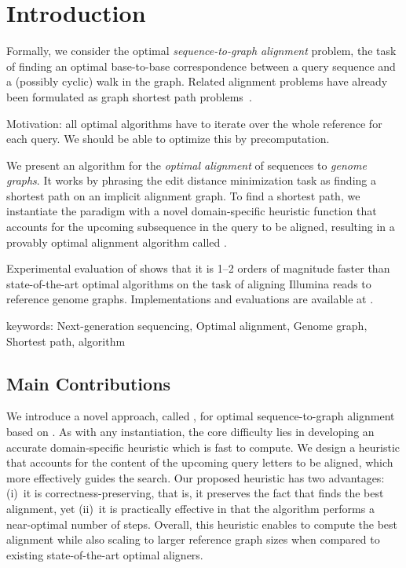 \section{Introduction}

Formally, we consider the optimal \emph{sequence-to-graph alignment} problem,
the task of finding an optimal base-to-base correspondence between a query
sequence and a (possibly cyclic) walk in the graph. Related alignment problems
have already been formulated as graph shortest path
problems~\cite{jain_complexity_2019}.

Motivation: all optimal algorithms have to iterate over the whole reference for
each query. We should be able to optimize this by precomputation.

We present an algorithm for the \emph{optimal alignment} of sequences to
\emph{genome graphs}. It works by phrasing the edit distance minimization
task as finding a shortest path on an implicit alignment graph. To find a
shortest path, we instantiate the \A paradigm with a novel domain-specific
heuristic function that accounts for the upcoming subsequence in the query
to be aligned, resulting in a provably optimal alignment algorithm called
\astarix.

\quad \quad Experimental evaluation of \astarix shows that it is 1--2
orders of magnitude faster than state-of-the-art optimal algorithms on the
task of aligning Illumina reads to reference genome graphs. Implementations
and evaluations are available at \mbox{\astarixurl}.

keywords: Next-generation sequencing, Optimal alignment, Genome graph,
Shortest path, \A algorithm

\subsection{Main Contributions}
We introduce a novel approach, called \astarix, for optimal sequence-to-graph
alignment based on \A. As with any \A instantiation, the core difficulty lies in
developing an accurate domain-specific heuristic which is fast to compute. We
design a heuristic that accounts for the content of the upcoming query letters
to be aligned, which more effectively guides the search. Our proposed heuristic
has two advantages: (i)~it is correctness-preserving, that is, it preserves the
fact that \astarix finds the best alignment, yet (ii)~it is practically
effective in that the algorithm performs a near-optimal number of steps.
Overall, this heuristic enables \astarix to compute the best alignment while
also scaling to larger reference graph sizes when compared to existing
state-of-the-art optimal aligners.

